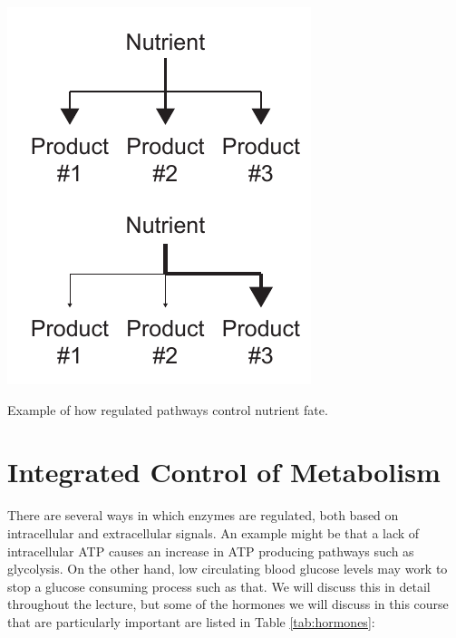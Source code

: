 \documentclass{tufte-handout}
\begin{document}
\begin{marginfigure}
\includegraphics[width=0.75\marginparwidth]{figures/nutrient-pathways.pdf}\
\caption{Example of how regulated pathways control nutrient fate.}
\label{fig:nutrient-pathways}
\end{marginfigure}

\section{Integrated Control of Metabolism}

There are several ways in which enzymes are regulated, both based on intracellular and extracellular signals.  An example might be that a lack of intracellular ATP causes an increase in ATP producing pathways such as glycolysis.  On the other hand, low circulating blood glucose levels may work to stop a glucose consuming process such as that.  We will discuss this in detail throughout the lecture, but some of the hormones we will discuss in this course that are particularly important are listed in Table \ref{tab:hormones}:
\end{document}
